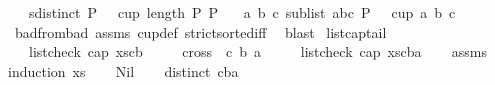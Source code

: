 \begin{isabellebody}
\ \ \ {\isachardoublequoteopen}sdistinct\ P{\isachardoublequoteclose}\ \ {\isachardoublequoteopen}{\isasymnot}\ cup\ {\isacharparenleft}{\kern0pt}length\ P{\isacharparenright}{\kern0pt}\ P{\isachardoublequoteclose}\isanewline
\ \ \ {\isachardoublequoteopen}{\isasymexists}a\ b\ c{\isachardot}{\kern0pt}\ {\isacharparenleft}{\kern0pt}sublist\ {\isacharbrackleft}{\kern0pt}a{\isacharcomma}{\kern0pt}b{\isacharcomma}{\kern0pt}c{\isacharbrackright}{\kern0pt}\ P{\isacharparenright}{\kern0pt}\ {\isasymand}\ {\isasymnot}\ cup{}\ a\ b\ c{\isachardoublequoteclose}\isanewline
%
\isadelimproof
\ \ %
\endisadelimproof
%
\isatagproof
{}\isamarkupfalse%
\ bad{}{\isacharunderscore}{\kern0pt}from{\isacharunderscore}{\kern0pt}bad\ assms{\isacharparenleft}{\kern0pt}{}{\isacharcomma}{\kern0pt}{}{\isacharparenright}{\kern0pt}\ cup{\isacharunderscore}{\kern0pt}def\ strict{\isacharunderscore}{\kern0pt}sorted{\isacharunderscore}{\kern0pt}iff\ \isamarkupfalse%
\ blast%
\endisatagproof
{\isafoldproof}%
%
\isadelimproof
\isanewline
%
\endisadelimproof
\isanewline
{}\isamarkupfalse%
\ list{\isacharunderscore}{\kern0pt}cap{\isacharunderscore}{\kern0pt}tail{\isacharcolon}{\kern0pt}\ \isanewline
\ \ \ {\isachardoublequoteopen}list{\isacharunderscore}{\kern0pt}check\ cap{}\ {\isacharparenleft}{\kern0pt}xs{\isacharat}{\kern0pt}{\isacharbrackleft}{\kern0pt}c{\isacharcomma}{\kern0pt}b{\isacharbrackright}{\kern0pt}{\isacharparenright}{\kern0pt}{\isachardoublequoteclose}\isanewline
\ \ \ \ \ {\isachardoublequoteopen}cross{}\ \ c\ b\ a\ {\isacharless}{\kern0pt}\ {}{\isachardoublequoteclose}\isanewline
\ \ \ {\isachardoublequoteopen}list{\isacharunderscore}{\kern0pt}check\ cap{}\ {\isacharparenleft}{\kern0pt}xs{\isacharat}{\kern0pt}{\isacharbrackleft}{\kern0pt}c{\isacharcomma}{\kern0pt}b{\isacharcomma}{\kern0pt}a{\isacharbrackright}{\kern0pt}{\isacharparenright}{\kern0pt}{\isachardoublequoteclose}\isanewline
%
\isadelimproof
\ \ %
\endisadelimproof
%
\isatagproof
{}\isamarkupfalse%
\ assms\isanewline
{}\isamarkupfalse%
{\isacharparenleft}{\kern0pt}induction\ xs{\isacharparenright}{\kern0pt}\isanewline
\ \ \isamarkupfalse%
\ Nil\isanewline
\ \ \isamarkupfalse%
\ {\isachardoublequoteopen}distinct\ {\isacharbrackleft}{\kern0pt}c{\isacharcomma}{\kern0pt}b{\isacharcomma}{\kern0pt}a{\isacharbrackright}{\kern0pt}{\isachardoublequoteclose}\ \isamarkupfalse%

\end{isabellebody}

